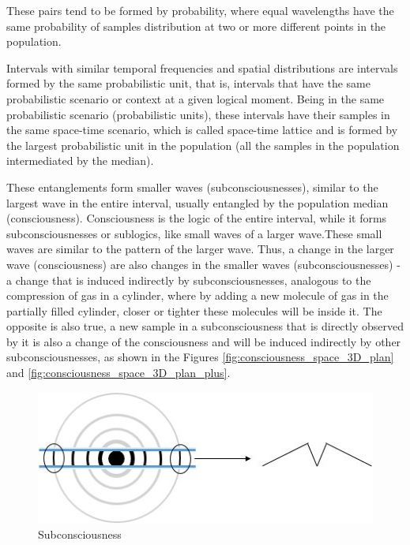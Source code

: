 These pairs tend to be formed by probability, where equal wavelengths have the same probability of samples distribution at two or more different points in the population. 

Intervals with similar temporal frequencies and spatial distributions are intervals formed by the same probabilistic unit, that is, intervals that have the same probabilistic scenario or context at a given logical moment. Being in the same probabilistic scenario (probabilistic units), these intervals have their samples in the same space-time scenario, which is called space-time lattice and is formed by the largest probabilistic unit in the population (all the samples in the population intermediated by the median). 

These entanglements form smaller waves (subconsciousnesses), similar to the largest wave in the entire interval, usually entangled by the population median (consciousness). Consciousness is the logic of the entire interval, while it forms subconsciousnesses or sublogics, like small waves of a larger wave.These small waves are similar to the pattern of the larger wave.  Thus, a change in the larger wave (consciousness) are also changes in the smaller waves (subconsciousnesses) - a change that is induced indirectly by subconsciousnesses, analogous to the compression of gas in a cylinder, where by adding a new molecule of gas in the partially filled cylinder, closer or tighter these molecules will be inside it.  The opposite is also true, a new sample in a subconsciousness that is directly observed by it is also a change of the consciousness and will be induced indirectly by other subconsciousnesses, as shown in the Figures \ref{fig:consciousness_space_3D_plan} and \ref{fig:consciousness_space_3D_plan_plus}.
	\begin{figure}[H]
	\caption{Subconsciousness}
	\label{fig:consciousness_subconscious}
	\centering
	\includegraphics[scale=.8]{sections/images/consciousness_subconscious.jpg}
	\end{figure}
	

